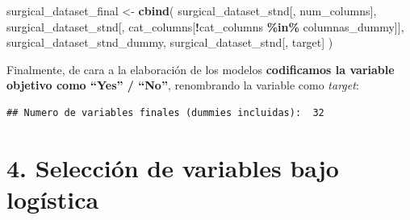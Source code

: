\documentclass[
]{article}
\newenvironment{Shaded}{\begin{snugshade}}{\end{snugshade}}
\newcommand{\CommentTok}[1]{\textcolor[rgb]{0.56,0.35,0.01}{\textit{#1}}}
\newcommand{\DecValTok}[1]{\textcolor[rgb]{0.00,0.00,0.81}{#1}}
\newcommand{\KeywordTok}[1]{\textcolor[rgb]{0.13,0.29,0.53}{\textbf{#1}}}
\newcommand{\NormalTok}[1]{#1}
\newcommand{\OperatorTok}[1]{\textcolor[rgb]{0.81,0.36,0.00}{\textbf{#1}}}
\newcommand{\StringTok}[1]{\textcolor[rgb]{0.31,0.60,0.02}{#1}}
\begin{document}
\begin{Shaded}
\begin{Highlighting}[]
\NormalTok{surgical\_dataset\_final <{-}}\StringTok{ }\KeywordTok{cbind}\NormalTok{(}
\NormalTok{                                surgical\_dataset\_stnd[, num\_columns],}
\NormalTok{                                surgical\_dataset\_stnd[, cat\_columns[}\OperatorTok{!}\NormalTok{cat\_columns }\OperatorTok{\%in\%}\StringTok{ }\NormalTok{columnas\_dummy]],}
\NormalTok{                                surgical\_dataset\_stnd\_dummy,}
\NormalTok{                                surgical\_dataset\_stnd[, target]}
\NormalTok{                              )}
\end{Highlighting}
\end{Shaded}

Finalmente, de cara a la elaboración de los modelos \textbf{codificamos
la variable objetivo como ``Yes'' / ``No''}, renombrando la variable
como \emph{target}:

\begin{Shaded}
\end{Shaded}

\begin{verbatim}
## Numero de variables finales (dummies incluidas):  32
\end{verbatim}

\hypertarget{selecciuxf3n-de-variables-bajo-loguxedstica}{%
\section{4. Selección de variables bajo
logística}\label{selecciuxf3n-de-variables-bajo-loguxedstica}}
\end{document}
